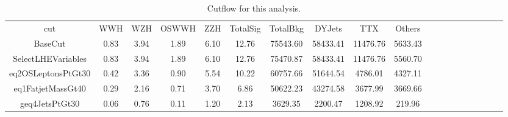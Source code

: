 \begin{table}[htp]
\begin{center}
\begin{tabular}{ccccccccccccccccccc}
\hline
\hline
       cut         & WWH  & WZH  & OSWWH &  ZZH  & TotalSig & TotalBkg &  DYJets  &   TTX    & Others  \\
     BaseCut       & 0.83 & 3.94 & 1.89  & 6.10  &  12.76   & 75543.60 & 58433.41 & 11476.76 & 5633.43 \\
SelectLHEVariables & 0.83 & 3.94 & 1.89  & 6.10  &  12.76   & 75470.87 & 58433.41 & 11476.76 & 5560.70 \\
eq2OSLeptonsPtGt30 & 0.42 & 3.36 & 0.90  & 5.54  &  10.22   & 60757.66 & 51644.54 & 4786.01  & 4327.11 \\
eq1FatjetMassGt40  & 0.29 & 2.16 & 0.71  & 3.70  &   6.86   & 50622.23 & 43274.58 & 3677.99  & 3669.66 \\
  geq4JetsPtGt30   & 0.06 & 0.76 & 0.11  & 1.20  &   2.13   & 3629.35  & 2200.47  & 1208.92  & 219.96  \\
\hline
\hline
\end{tabular}
\end{center}
\caption{Cutflow for this analysis.}
\label{tab:cutflow}
\end{table}
